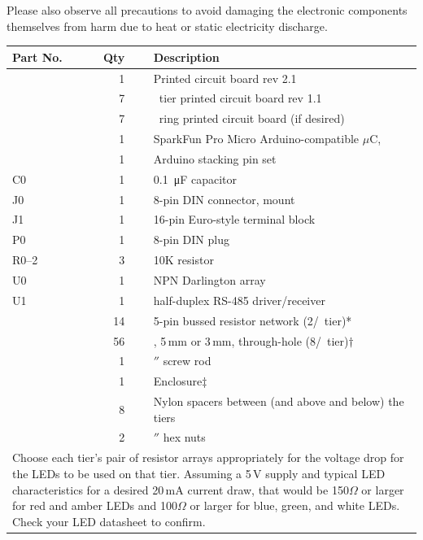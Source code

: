  Please also observe all precautions to avoid damaging
the electronic components themselves from harm due to heat or static electricity discharge.
\begin{table}
    \begin{center}
	\begin{tabular}{lrll}\toprule
		{\bfseries Part No.}&{\bfseries Qty}&&{\bfseries Description}\\\midrule
		&1&&Printed circuit board rev 2.1\\
		&7&&\led\ tier printed circuit board rev 1.1\\
		&7&&\led\ ring printed circuit board (if desired)\\
		&1&&SparkFun Pro Micro Arduino-compatible $\mu$C, \strong{5\,V version}\\
		&1&&Arduino stacking pin set\\
		C0&1&&\SI{0.1}{\micro\farad} capacitor\\
		J0&1&&8-pin DIN connector, \acronym{PCB} mount\\
		J1&1&&16-pin Euro-style terminal block\\
		P0&1&&8-pin DIN plug\\
		R0--2&3&&10K resistor\\
		U0&1&&\mc{ULN2003A} NPN Darlington array\\
		U1&1&&\mc{THVD1439} half-duplex RS-485 driver/receiver\\
		  &14&&5-pin bussed resistor network (2/\led\ tier)*\\
		  &56&&\led, 5\,mm or 3\,mm, through-hole (8/\led\ tier)$\dagger$\\
		  &1&&\sfrac14$''$ screw rod\\
		  &1&&Enclosure$\ddagger$\\
		  &8&&Nylon spacers between (and above and below) the tiers\\
		  &2&&\sfrac14$''$ hex nuts\\
		\bottomrule
		\multicolumn{4}{p{\textwidth}}{\tiny *Choose each tier's pair of resistor arrays appropriately for the voltage drop
		for the LEDs to be used on that tier. Assuming a 5\,V supply and
		typical LED characteristics for a desired 20\,mA current draw, that would be 150$\Omega$ or larger for red and amber LEDs and 100$\Omega$ or larger
		for blue, green, and white LEDs. Check your LED datasheet to confirm.

}
\end{tabular}
\end{center}
\end{table}
